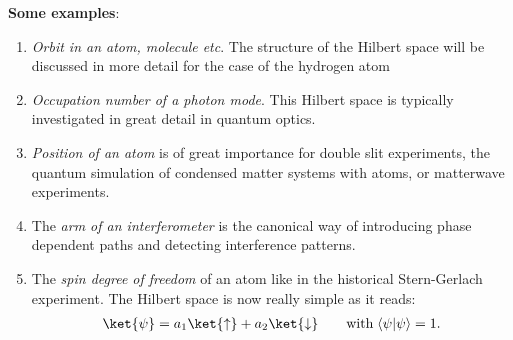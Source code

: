 \textbf{Some examples}:
\begin{enumerate}
\item \textit{Orbit in an atom, molecule etc}. The structure of the Hilbert space will be discussed in more detail for the case of the hydrogen atom
\item \textit{Occupation number of a photon mode}. This Hilbert space is typically investigated in great detail in quantum optics.
\item \textit{Position of an atom} is of great importance for double slit experiments, the quantum simulation of condensed matter systems with atoms,  or matterwave experiments.
\item The \textit{arm of an interferometer} is the canonical way of introducing phase dependent paths and detecting interference patterns.
\item The \textit{spin degree of freedom} of an atom like in the historical Stern-Gerlach experiment. The Hilbert space is now really simple as it reads:
\begin{align}
	\ket{\psi} = a_1 \ket{\uparrow} + a_2 \ket{\downarrow}  \qquad \text{with} \; \langle\psi | \psi\rangle = 1.
\end{align}
\end{enumerate}